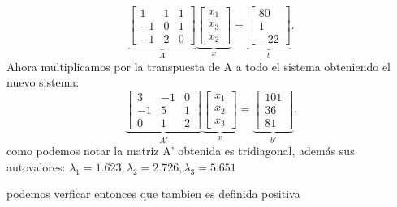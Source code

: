 \begin{frame}
\begin{solution}
\begin{enumerate}[b)]
			      \begin{equation*}
				      \underbrace{
					      \begin{bmatrix}
						      1  & 1 & 1 \\
						      -1 & 0 & 1 \\
						      -1 & 2 & 0
					      \end{bmatrix}
				      }_{\displaystyle A}
				      \underbrace{
					      \begin{bmatrix}
						      x_{1} \\
						      x_{3} \\
						      x_{2}
					      \end{bmatrix}
				      }_{\displaystyle x}
				      =
				      \underbrace{
					      \begin{bmatrix}
						      80 \\
						      1  \\
						      -22
					      \end{bmatrix}
				      }_{\displaystyle b}.
			      \end{equation*}
         Ahora multiplicamos por la transpuesta de A a todo el sistema obteniendo el nuevo sistema:
          \begin{equation*}
				      \underbrace{
					      \begin{bmatrix}
						      3  & -1 & 0 \\
						      -1 & 5 & 1 \\
						      0 & 1 & 2
					      \end{bmatrix}
				      }_{\displaystyle A'}
				      \underbrace{
					      \begin{bmatrix}
						      x_{1} \\
						      x_{2} \\
						      x_{3}
					      \end{bmatrix}
				      }_{\displaystyle x}
				      =
				      \underbrace{
					      \begin{bmatrix}
						      101 \\
						      36  \\
						      81
					      \end{bmatrix}
				      }_{\displaystyle b'}.
			      \end{equation*}
         como podemos notar la matriz A' obtenida es tridiagonal, además sus autovalores:
             \begin{math}
				λ_{1}=1.623,
                λ_{2}=2.726,
                λ_{3}=5.651
			\end{math}
         
         podemos verficar entonces que tambien es definida positiva
		\end{enumerate}
	\end{solution}
\end{frame}

